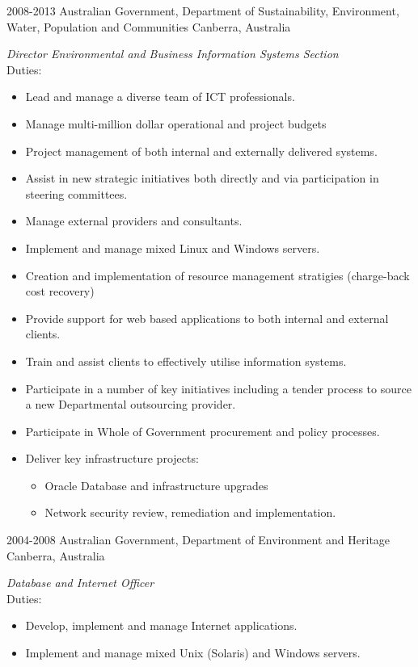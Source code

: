 \documentclass[]{friggeri-cv} %
\begin{document}
\begin{entrylist}
\entry
{2008-2013}
{Australian Government, Department of Sustainability, Environment, Water, Population and Communities}
{Canberra, Australia}
{\emph{Director Environmental and Business Information Systems Section} \\
Duties:
\begin{itemize}
\item Lead and manage a diverse team of ICT professionals.
\item Manage multi-million dollar operational and project budgets
\item Project management of both internal and externally delivered systems.
\item Assist in new strategic initiatives both directly and via participation in steering committees.
\item Manage external providers and consultants.
\item Implement and manage mixed Linux and Windows servers.
\item Creation and implementation of resource management stratigies (charge-back cost recovery)
\item Provide support for web based applications to both internal and external clients.
\item Train and assist clients to effectively utilise information systems.
\item Participate in a number of key initiatives including a tender process to source a new Departmental outsourcing provider.
\item Participate in Whole of Government procurement and policy processes.
\item Deliver key infrastructure projects:
\begin{itemize}
\item Oracle Database and infrastructure upgrades
\item Network security review, remediation and implementation.
\end{itemize}
\end{itemize}}
\entry
{2004-2008}
{Australian Government, Department of Environment and Heritage}
{Canberra, Australia}
{\emph{Database and Internet Officer} \\
Duties:
\begin{itemize}
\item Develop, implement and manage Internet applications.
\item Implement and manage mixed Unix (Solaris) and Windows servers.

\end{itemize}}
\end{entrylist}
\end{document}
